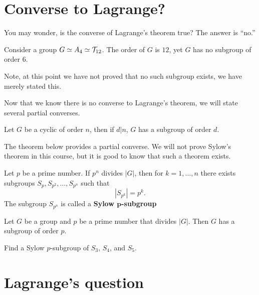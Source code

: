 \documentclass{ximera}
\begin{document}
\section{Converse to Lagrange?}

You may wonder, is the converse of Lagrange's theorem true? The answer
is ``no.''

\begin{example}
  Consider a group $G\simeq A_4\simeq \mathcal{T}_{12}$. The order of $G$
  is $12$, yet $G$ has no subgroup of order $6$.

  Note, at this point we have not proved that no such subgroup exists,
  we have merely stated this.
\end{example}

Now that we know there is no converse to Lagrange's theorem, we will
state several partial converses.


\begin{exercise}
  Let $G$ be a cyclic of order $n$, then if $d|n$, $G$ has a subgroup
  of order $d$.
\end{exercise}




The theorem below provides a partial converse. We will not prove
Sylow's theorem in this course, but it is good to know that such a
theorem exists.

\begin{theorem}
  Let $p$ be a prime number. If $p^n$ divides $|G|$, then for $k =
  1,\dots, n$ there exists subgroups $S_p, S_{p^2},\dots,S_{p^n}$ such
  that
  \[
  |S_{p^k}| = p^k.
  \]
  The subgroup $S_{p^n}$ is called a \textbf{Sylow
    $\boldsymbol{p}$-subgroup}
\end{theorem}

\begin{corollary}
  Let $G$ be a group and $p$ be a prime number that divides
  $|G|$. Then $G$ has a subgroup of order $p$.
\end{corollary}

\begin{exercise}
  Find a Sylow $p$-subgroup of $S_3$, $S_4$, and $S_5$.
\end{exercise}





\section{Lagrange's question}
\end{document}
